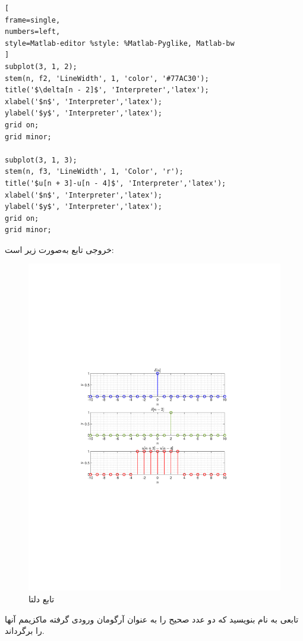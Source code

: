 \documentclass[12pt]{exam}
\begin{document}
\begin{questions}
\begin{latin}
\begin{lstlisting}[
frame=single,
numbers=left,
style=Matlab-editor %style: %Matlab-Pyglike, Matlab-bw
]
subplot(3, 1, 2);
stem(n, f2, 'LineWidth', 1, 'color', '#77AC30');
title('$\delta[n - 2]$', 'Interpreter','latex');
xlabel('$n$', 'Interpreter','latex');
ylabel('$y$', 'Interpreter','latex');
grid on;
grid minor;

subplot(3, 1, 3);
stem(n, f3, 'LineWidth', 1, 'Color', 'r');
title('$u[n + 3]-u[n - 4]$', 'Interpreter','latex');
xlabel('$n$', 'Interpreter','latex');
ylabel('$y$', 'Interpreter','latex');
grid on;
grid minor;
\end{lstlisting}
\end{latin}

خروجی تابع به‌صورت زیر است:
\begin{figure}
	\includegraphics[width=\linewidth]{images/delta_dirac_function.pdf}
	\caption{تابع دلتا}
	\label{دلتا}
\end{figure}



\question 
تابعی به نام 
بنویسید که دو عدد صحیح را به عنوان آرگومان ورودی گرفته ماکزیمم آنها را برگرداند.
\begin{parts}

\end{parts}
\end{questions}
\end{document}
